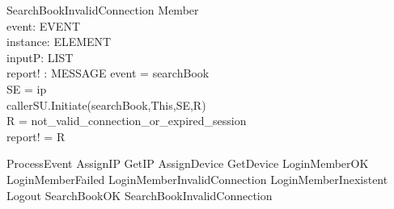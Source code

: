 \begin{schema}{SearchBookInvalidConnection}
\Xi Member \\
event: EVENT \\
instance: ELEMENT \\
inputP: LIST \\
report! : MESSAGE 
\where event = searchBook \\
SE = \lseq ip \rseq \\
callerSU.Initiate(searchBook,This,SE,R) \\
R = not\_valid\_connection\_or\_expired\_session \\ 
report! = R
\end{schema}

\begin{zed} ProcessEvent \sdef AssignIP
\lor GetIP
\lor AssignDevice
\lor GetDevice
\lor LoginMemberOK
\lor LoginMemberFailed
\lor LoginMemberInvalidConnection
\lor LoginMemberInexistent
\lor Logout
\lor SearchBookOK
\lor SearchBookInvalidConnection
\end{zed}


